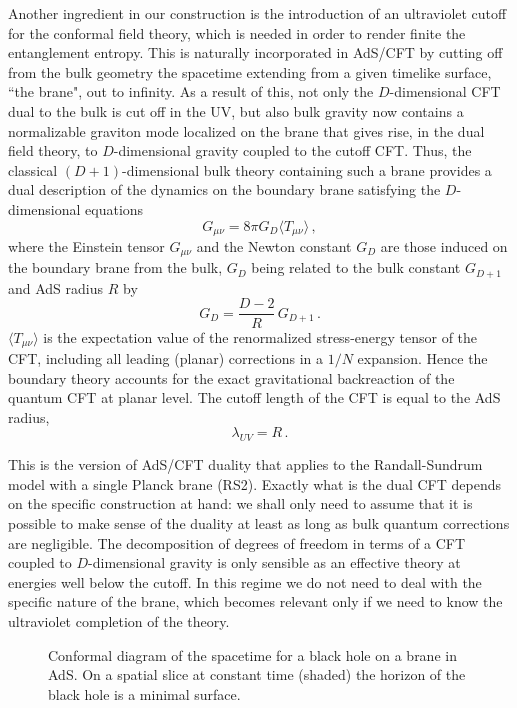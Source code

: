 \documentclass[12pt]{article}
\newcommand{\beq}{\begin{equation}}
\newcommand{\eeq}{\end{equation}}
\begin{document}
Another ingredient in our construction is the introduction of an
ultraviolet cutoff for the conformal field theory, which is needed in
order to render finite the entanglement entropy. This is naturally
incorporated in AdS/CFT by cutting off from the bulk geometry the
spacetime extending from a given timelike surface, ``the brane", out to
infinity. As a result of this, not only the $D$-dimensional CFT dual to
the bulk is cut off in the UV, but also bulk gravity now contains a
normalizable graviton mode localized on the brane \cite{rs2} that gives
rise, in the dual field theory, to $D$-dimensional gravity coupled to
the cutoff CFT. Thus, the classical $(D+1)$-dimensional bulk theory
containing such a brane provides a dual description of the dynamics on
the boundary brane satisfying the $D$-dimensional equations
\cite{gubser}
\beq\label{dualeqs}
G_{\mu\nu}=8\pi G_{D}\langle T_{\mu\nu}\rangle\,,
\eeq 
where the Einstein tensor $G_{\mu\nu}$ and the Newton constant $G_{D}$
are those induced on the boundary brane from the bulk, $G_{D}$ being
related to the bulk constant $G_{D+1}$ and AdS radius $R$ by
\beq\label{gg}
G_{D}=\frac{D-2}{R}\,G_{D+1}\,.
\eeq
$\langle T_{\mu\nu}\rangle$ is the expectation value of the renormalized
stress-energy tensor of the CFT, including all leading (planar)
corrections in a $1/N$ expansion. Hence the boundary theory accounts for
the exact gravitational backreaction of the quantum CFT at planar level.
The cutoff length of the CFT is equal to the AdS radius,
\beq\label{uvcutoff}
\lambda_{UV}=R\,. 
\eeq

This is the version of AdS/CFT duality that applies to the
Randall-Sundrum model with a single Planck brane (RS2). Exactly what is
the dual CFT depends on the specific construction at hand: we shall only
need to assume that it is possible to make sense of the duality at least
as long as bulk quantum corrections are negligible. The decomposition of
degrees of freedom in terms of a CFT coupled to $D$-dimensional gravity
is only sensible as an effective theory at energies well below the
cutoff. In this regime we do not need to deal with the specific nature
of the brane, which becomes relevant only if we need to know the
ultraviolet completion of the theory.

\begin{figure}%
\begin{center}\leavevmode  %
\epsfxsize=7cm 
\end{center}
\caption{\small Conformal diagram of the spacetime for a black hole on a
brane in AdS. On a spatial slice at constant time (shaded) the horizon
of the black hole is a minimal surface.
}
\label{fig:rs2bh}
\end{figure}
\end{document}

